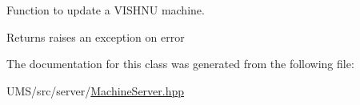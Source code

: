 Function to update a VISHNU machine. 

\begin{DoxyReturn}{Returns}
raises an exception on error 
\end{DoxyReturn}


The documentation for this class was generated from the following file:\begin{DoxyCompactItemize}
\item 
UMS/src/server/\hyperlink{MachineServer_8hpp}{MachineServer.hpp}\end{DoxyCompactItemize}
